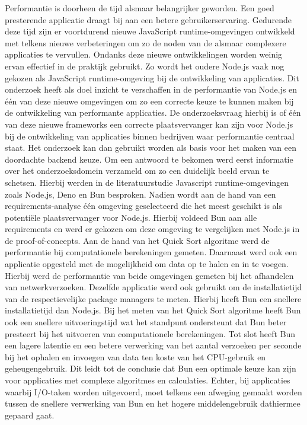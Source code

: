 Performantie is doorheen de tijd alsmaar belangrijker geworden. 
Een goed presterende applicatie draagt bij aan een betere gebruikerservaring.
Gedurende deze tijd zijn er voortdurend nieuwe JavaScript runtime-omgevingen ontwikkeld met telkens nieuwe verbeteringen om
zo de noden van de alsmaar complexere applicaties te vervullen. 
Ondanks deze nieuwe ontwikkelingen worden weinig ervan effectief in de praktijk gebruikt.
Zo wordt het oudere Node.js vaak nog gekozen als JavaScript runtime-omgeving bij de ontwikkeling van applicaties.
Dit onderzoek heeft als doel inzicht te verschaffen in de performantie van Node.js en één van deze nieuwe omgevingen
om zo een correcte keuze te kunnen maken bij de ontwikkeling van performante applicaties.
De onderzoeksvraag hierbij is of één van deze nieuwe frameworks  
een correcte plaatsvervanger kan zijn voor Node.js bij de ontwikkeling van applicaties binnen bedrijven 
waar performantie centraal staat. Het onderzoek kan dan gebruikt worden als basis 
voor het maken van een doordachte backend keuze.
Om een antwoord te bekomen werd eerst informatie over het onderzoeksdomein verzameld om zo een duidelijk beeld ervan te schetsen.
Hierbij werden in de literatuurstudie Javascript runtime-omgevingen zoals Node.js, Deno en Bun besproken.
Nadien wordt aan de hand van een requirements-analyse één omgeving geselecteerd die het meest geschikt is als potentiële plaatsvervanger voor Node.js.
Hierbij voldeed Bun aan alle requirements en werd er gekozen om deze omgeving te vergelijken met Node.js in de proof-of-concepts.
Aan de hand van het Quick Sort algoritme werd de performantie bij computationele berekeningen gemeten.
Daarnaast werd ook een applicatie opgesteld met de mogelijkheid om data op te halen en in te voegen. 
Hierbij werd de performantie van beide omgevingen gemeten bij het afhandelen van netwerkverzoeken.
Dezelfde applicatie werd ook gebruikt om de installatietijd van de respectievelijke package managers te meten.
Hierbij heeft Bun een snellere installatietijd dan Node.js.
Bij het meten van het Quick Sort algoritme heeft Bun ook een snellere uitvoeringstijd wat het standpunt 
ondersteunt dat Bun beter presteert bij het uitvoeren van computationele berekeningen.
Tot slot heeft Bun een lagere latentie en een betere verwerking van het aantal verzoeken per seconde bij het ophalen en
invoegen van data ten koste van het CPU-gebruik en geheugengebruik.
Dit leidt tot de conclusie dat Bun een optimale keuze kan zijn voor applicaties met complexe algoritmes en calculaties. Echter, 
bij applicaties waarbij I/O-taken worden uitgevoerd, moet telkens een afweging gemaakt worden tussen de snellere verwerking van Bun
en het hogere middelengebruik dathiermee gepaard gaat.


